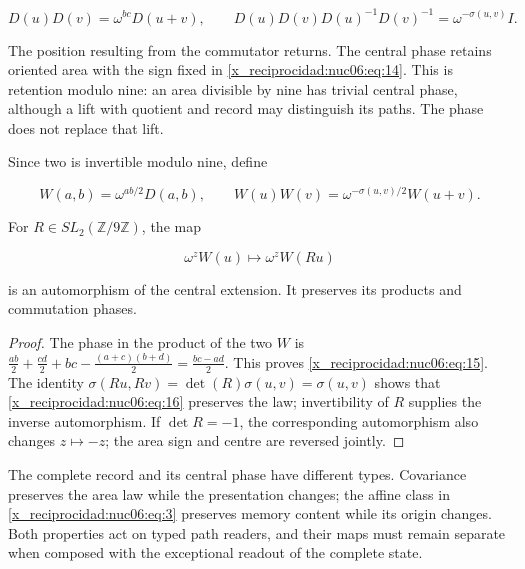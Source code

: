 \begin{equation}
D(u)D(v)=\omega^{bc}D(u+v),\qquad
D(u)D(v)D(u)^{-1}D(v)^{-1}=\omega^{-\sigma(u,v)}I.
\label{x_reciprocidad:nuc06:eq:14}
\end{equation}

The position resulting from the commutator returns. The central phase retains oriented area with the sign fixed in \eqref{x_reciprocidad:nuc06:eq:14}. This is retention modulo nine: an area divisible by nine has trivial central phase, although a lift with quotient and record may distinguish its paths. The phase does not replace that lift.

\begin{proposition}

Since two is invertible modulo nine, define

\begin{equation}
W(a,b)=\omega^{ab/2}D(a,b),\qquad
W(u)W(v)=\omega^{-\sigma(u,v)/2}W(u+v).
\label{x_reciprocidad:nuc06:eq:15}
\end{equation}

For \(R\in SL_2(\mathbb Z/9\mathbb Z)\), the map

\begin{equation}
\omega^zW(u)\longmapsto\omega^zW(Ru)
\label{x_reciprocidad:nuc06:eq:16}
\end{equation}

is an automorphism of the central extension. It preserves its products and commutation phases.
\end{proposition}

\begin{proof}
The phase in the product of the two \(W\) is
\(\frac{ab}{2}+\frac{cd}{2}+bc-\frac{(a+c)(b+d)}2=\frac{bc-ad}{2}\). This proves \eqref{x_reciprocidad:nuc06:eq:15}. The identity \(\sigma(Ru,Rv)=\det(R)\sigma(u,v)=\sigma(u,v)\) shows that \eqref{x_reciprocidad:nuc06:eq:16} preserves the law; invertibility of \(R\) supplies the inverse automorphism. If \(\det R=-1\), the corresponding automorphism also changes \(z\mapsto-z\); the area sign and centre are reversed jointly.
\end{proof}

The complete record and its central phase have different types. Covariance preserves the area law while the presentation changes; the affine class in \eqref{x_reciprocidad:nuc06:eq:3} preserves memory content while its origin changes. Both properties act on typed path readers, and their maps must remain separate when composed with the exceptional readout of the complete state.

